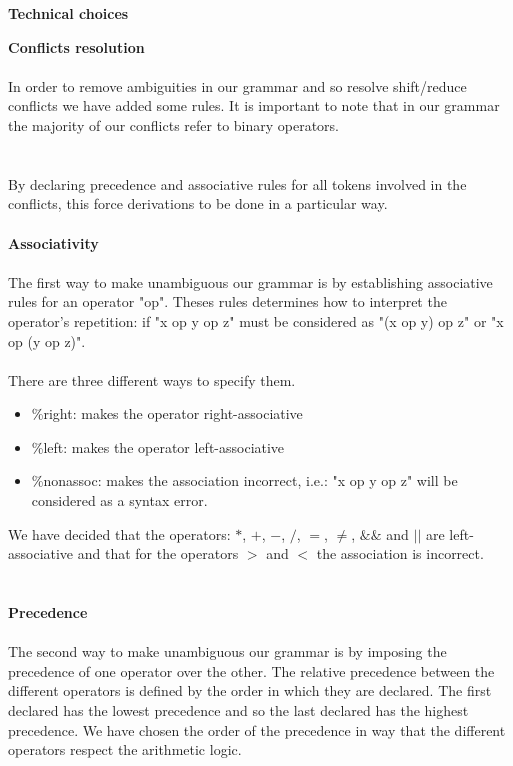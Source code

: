 \documentclass[11pt]{report}
\begin{document}
\newpage
\centerline{\textbf{\Huge Technical choices}}
\vspace*{3pt}
\vspace*{10pt}
\tabto{0cm} {\Large \textbf{Conflicts resolution}}
\\ \\ 
\tabto{1cm} In order to remove ambiguities in our grammar and so resolve shift/reduce conflicts we have added some rules. It is important to note that in our grammar the majority of our conflicts refer to binary operators.  \\ \\ \\
By declaring precedence and associative rules for all tokens involved in the conflicts, this force derivations to be done in a particular way.
\\ \\ 
\tabto{2cm} \textbf{Associativity}
\\ \\
\tabto{1cm} The first way to make unambiguous our grammar is by establishing associative rules for an operator "op". Theses rules determines how to interpret the operator's repetition: if "x op y op z" must be considered as "(x op y) op z" or "x op (y op z)". \\ \\
There are three different ways to specify them. 
\begin{itemize}
\item \%right:  makes the operator right-associative
\item \%left: makes the operator left-associative
\item \%nonassoc: makes the association incorrect, i.e.: "x op y op z" will be considered as a syntax error.
\end{itemize}
We have decided that the operators: $*$, $+$, $-$, $/$, $=$, $\ne$, $\&\&$ and $||$ are left-associative and that for the operators $>$ and $<$ the association is incorrect.
\\ \\ \\
\tabto{2cm} \textbf{Precedence}
\\ \\
\tabto{1cm} The second way to make unambiguous our grammar is by imposing the precedence of one operator over the other. The relative precedence between the different operators is defined by the order in which they are declared. The first declared has the lowest precedence and so the last declared has the highest precedence. We have chosen the order of the precedence in way that the different operators respect the arithmetic logic.
\end{document}
